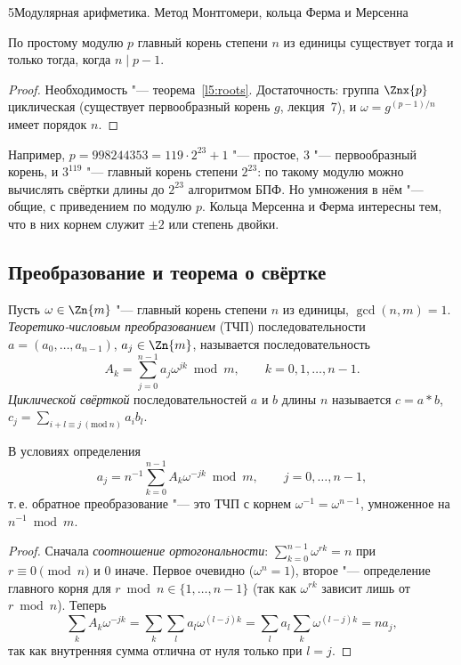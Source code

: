 \begin{lecture}{5}{Модулярная арифметика. Метод Монтгомери, кольца Ферма и Мерсенна}
\begin{corollary}\label{l5:roots-prime}
По простому модулю $p$ главный корень степени $n$ из единицы существует тогда и только тогда,
когда $n \mid p - 1$.
\end{corollary}

\begin{proof}
Необходимость "--- теорема~\ref{l5:roots}. Достаточность: группа $\Znx{p}$ циклическая
(существует первообразный корень $g$, лекция~7), и $\omega = g^{(p-1)/n}$ имеет порядок $n$.
\end{proof}

Например, $p = 998244353 = 119 \cdot 2^{23} + 1$ "--- простое, $3$ "--- первообразный корень,
и $3^{119}$ "--- главный корень степени $2^{23}$: по такому модулю можно вычислять свёртки
длины до $2^{23}$ алгоритмом БПФ. Но умножения в нём "--- общие, с приведением по модулю $p$.
Кольца Мерсенна и Ферма интересны тем, что в них корнем служит $\pm 2$ или степень двойки.

\subsection{Преобразование и теорема о свёртке}

\begin{definition}
Пусть $\omega \in \Zn{m}$ "--- главный корень степени $n$ из единицы, $\gcd(n, m) = 1$.
\emph{Теоретико-числовым преобразованием} (ТЧП) последовательности
$a = (a_0, \dots, a_{n-1})$, $a_j \in \Zn{m}$, называется последовательность
\[
  A_k = \sum_{j=0}^{n-1} a_j \omega^{jk} \bmod m, \qquad k = 0, 1, \dots, n - 1.
\]
\emph{Циклической свёрткой} последовательностей $a$ и $b$ длины $n$ называется
$c = a * b$, $c_j = \sum_{i + l \equiv j \ (\mathrm{mod}\ n)} a_i b_l$.
\end{definition}

\begin{theorem}\label{l5:inverse}
В условиях определения
\[
  a_j = n^{-1} \sum_{k=0}^{n-1} A_k \omega^{-jk} \bmod m, \qquad j = 0, \dots, n - 1,
\]
т.\,е. обратное преобразование "--- это ТЧП с корнем $\omega^{-1} = \omega^{n-1}$, умноженное
на $n^{-1} \bmod m$.
\end{theorem}

\begin{proof}
Сначала \emph{соотношение ортогональности}: $\sum_{k=0}^{n-1} \omega^{rk} = n$ при
$r \equiv 0 \pmod n$ и $0$ иначе. Первое очевидно ($\omega^n = 1$), второе "--- определение
главного корня для $r \bmod n \in \{1, \dots, n-1\}$ (так как $\omega^{rk}$ зависит лишь от
$r \bmod n$). Теперь
\[
  \sum_{k} A_k \omega^{-jk} = \sum_k \sum_l a_l \omega^{(l - j)k}
  = \sum_l a_l \sum_k \omega^{(l-j)k} = n a_j,
\]
так как внутренняя сумма отлична от нуля только при $l = j$.
\end{proof}


\end{lecture}
